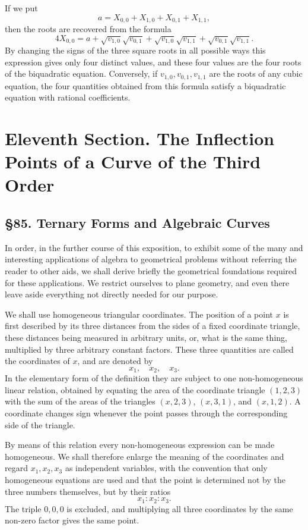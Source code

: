 \documentclass[11pt,a4paper]{book}
\newcommand{\webersection}[2]{\clearpage\section*{\S #1. #2}}
\newcommand{\booktitle}[1]{\clearpage\chapter*{#1}}
\begin{document}
If we put
\[
 a=X_{0,0}+X_{1,0}+X_{0,1}+X_{1,1},
\]
then the roots are recovered from the formula
\[
 4X_{0,0}
 =
 a+\sqrt{v_{1,0}}\sqrt{v_{0,1}}
  +\sqrt{v_{1,0}}\sqrt{v_{1,1}}
  +\sqrt{v_{0,1}}\sqrt{v_{1,1}}.
\]
By changing the signs of the three square roots in all possible ways this expression gives only four distinct values, and these four values are the four roots of the biquadratic equation.  Conversely, if \(v_{1,0},v_{0,1},v_{1,1}\) are the roots of any cubic equation, the four quantities obtained from this formula satisfy a biquadratic equation with rational coefficients.


\booktitle{Eleventh Section. The Inflection Points of a Curve of the Third Order}

\webersection{85}{Ternary Forms and Algebraic Curves}

In order, in the further course of this exposition, to exhibit some of the many and interesting applications of algebra to geometrical problems without referring the reader to other aids, we shall derive briefly the geometrical foundations required for these applications.  We restrict ourselves to plane geometry, and even there leave aside everything not directly needed for our purpose.

We shall use homogeneous triangular coordinates.  The position of a point \(x\) is first described by its three distances from the sides of a fixed coordinate triangle, these distances being measured in arbitrary units, or, what is the same thing, multiplied by three arbitrary constant factors.  These three quantities are called the coordinates of \(x\), and are denoted by
\[
x_1,\quad x_2,\quad x_3.
\]
In the elementary form of the definition they are subject to one non-homogeneous linear relation, obtained by equating the area of the coordinate triangle \((1,2,3)\) with the sum of the areas of the triangles \((x,2,3)\), \((x,3,1)\), and \((x,1,2)\).  A coordinate changes sign whenever the point passes through the corresponding side of the triangle.

By means of this relation every non-homogeneous expression can be made homogeneous.  We shall therefore enlarge the meaning of the coordinates and regard \(x_1,x_2,x_3\) as independent variables, with the convention that only homogeneous equations are used and that the point is determined not by the three numbers themselves, but by their ratios
\[
x_1:x_2:x_3.
\]
The triple \(0,0,0\) is excluded, and multiplying all three coordinates by the same non-zero factor gives the same point.
\end{document}
